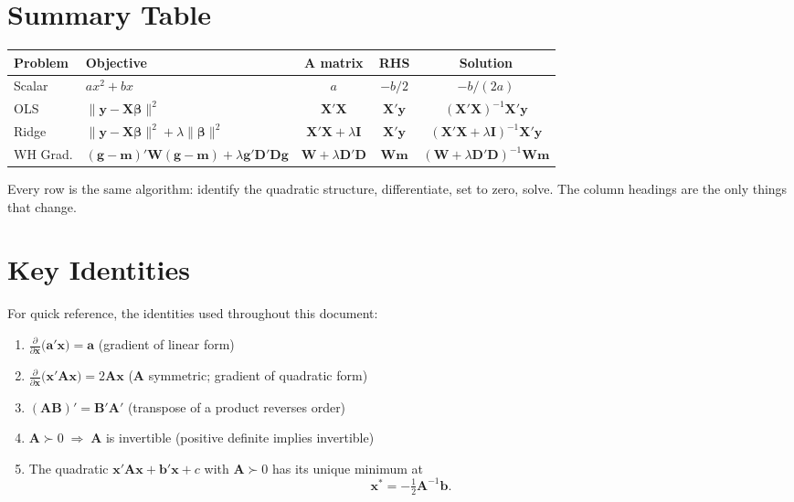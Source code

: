 \documentclass[11pt,a4paper]{article}
\begin{document}
\section{Summary Table}

\begin{center}
\renewcommand{\arraystretch}{1.6}
\begin{tabular}{l l c c c}
\toprule
\textbf{Problem} & \textbf{Objective} & $\bm{A}$ \textbf{matrix} & \textbf{RHS} & \textbf{Solution} \\
\midrule
Scalar & $ax^2 + bx$ & $a$ & $-b/2$ & $-b/(2a)$ \\[4pt]
OLS & $\|\bm{y}-\bm{X}\bm{\beta}\|^2$ & $\bm{X}'\bm{X}$ & $\bm{X}'\bm{y}$ & $(\bm{X}'\bm{X})^{-1}\bm{X}'\bm{y}$ \\[4pt]
Ridge & $\|\bm{y}-\bm{X}\bm{\beta}\|^2 + \lambda\|\bm{\beta}\|^2$ & $\bm{X}'\bm{X}+\lambda\bm{I}$ & $\bm{X}'\bm{y}$ & $(\bm{X}'\bm{X}+\lambda\bm{I})^{-1}\bm{X}'\bm{y}$ \\[4pt]
WH Grad. & $(\bm{g}-\bm{m})'\bm{W}(\bm{g}-\bm{m})+\lambda\bm{g}'\bm{D}'\bm{D}\bm{g}$ & $\bm{W}+\lambda\bm{D}'\bm{D}$ & $\bm{W}\bm{m}$ & $(\bm{W}+\lambda\bm{D}'\bm{D})^{-1}\bm{W}\bm{m}$ \\
\bottomrule
\end{tabular}
\end{center}

\medskip
\noindent Every row is the same algorithm: identify the quadratic structure, differentiate, set to zero, solve. The column headings are the only things that change.

\section{Key Identities}

For quick reference, the identities used throughout this document:

\begin{enumerate}[nosep,label=(\roman*)]
\item $\displaystyle\frac{\partial}{\partial \bm{x}}\bigl(\bm{a}'\bm{x}\bigr) = \bm{a}$ \hfill (gradient of linear form)

\item $\displaystyle\frac{\partial}{\partial \bm{x}}\bigl(\bm{x}'\bm{A}\bm{x}\bigr) = 2\bm{A}\bm{x}$ \hfill ($\bm{A}$ symmetric; gradient of quadratic form)

\item $(\bm{A}\bm{B})' = \bm{B}'\bm{A}'$ \hfill (transpose of a product reverses order)

\item $\bm{A} \succ 0 \;\Longrightarrow\; \bm{A}$ is invertible \hfill (positive definite implies invertible)

\item The quadratic $\bm{x}'\bm{A}\bm{x} + \bm{b}'\bm{x} + c$ with $\bm{A} \succ 0$ has its unique minimum at
\[
\bm{x}^* = -\tfrac{1}{2}\bm{A}^{-1}\bm{b}.
\]
\end{enumerate}
\end{document}
